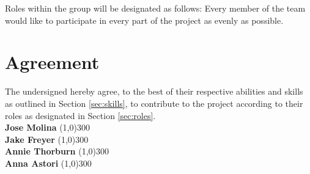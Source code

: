 \documentclass{article}
\newcommand{\groupmember}[1]{#1}
\newcommand{\sigline}[2]{\vspace{2em} #1 \hfill \line(1,0){#2}}
\begin{document}
Roles within the group will be designated as follows:
Every member of the team would like to participate in every part of the project as evenly
as possible.


\section{Agreement} %
\label{par:agreement}
The undersigned hereby agree, to the best of their respective abilities and skills as outlined in Section \ref{sec:skills}, to contribute to the project according to their roles as designated in Section \ref{sec:roles}.%
\vspace{2em}\\
\sigline{\textbf{\groupmember{Jose Molina}}}{300}\\
\sigline{\textbf{\groupmember{Jake Freyer}}}{300}\\
\sigline{\textbf{\groupmember{Annie Thorburn}}}{300}\\
\sigline{\textbf{\groupmember{Anna Astori}}}{300}\\
\end{document}
